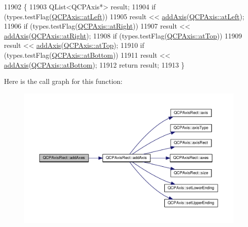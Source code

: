 \begin{DoxyCode}
11902 \{
11903   QList<QCPAxis*> result;
11904   \textcolor{keywordflow}{if} (types.testFlag(\hyperlink{class_q_c_p_axis_ae2bcc1728b382f10f064612b368bc18aaf84aa6cac6fb6099f54a2cbf7546b730}{QCPAxis::atLeft}))
11905     result << \hyperlink{class_q_c_p_axis_rect_a2dc336092ccc57d44a46194c8a23e4f4}{addAxis}(\hyperlink{class_q_c_p_axis_ae2bcc1728b382f10f064612b368bc18aaf84aa6cac6fb6099f54a2cbf7546b730}{QCPAxis::atLeft});
11906   \textcolor{keywordflow}{if} (types.testFlag(\hyperlink{class_q_c_p_axis_ae2bcc1728b382f10f064612b368bc18aadf5509f7d29199ef2f263b1dd224b345}{QCPAxis::atRight}))
11907     result << \hyperlink{class_q_c_p_axis_rect_a2dc336092ccc57d44a46194c8a23e4f4}{addAxis}(\hyperlink{class_q_c_p_axis_ae2bcc1728b382f10f064612b368bc18aadf5509f7d29199ef2f263b1dd224b345}{QCPAxis::atRight});
11908   \textcolor{keywordflow}{if} (types.testFlag(\hyperlink{class_q_c_p_axis_ae2bcc1728b382f10f064612b368bc18aac0ece2b680d3f545e701f75af1655977}{QCPAxis::atTop}))
11909     result << \hyperlink{class_q_c_p_axis_rect_a2dc336092ccc57d44a46194c8a23e4f4}{addAxis}(\hyperlink{class_q_c_p_axis_ae2bcc1728b382f10f064612b368bc18aac0ece2b680d3f545e701f75af1655977}{QCPAxis::atTop});
11910   \textcolor{keywordflow}{if} (types.testFlag(\hyperlink{class_q_c_p_axis_ae2bcc1728b382f10f064612b368bc18aa220d68888516b6c3b493d144f1ba438f}{QCPAxis::atBottom}))
11911     result << \hyperlink{class_q_c_p_axis_rect_a2dc336092ccc57d44a46194c8a23e4f4}{addAxis}(\hyperlink{class_q_c_p_axis_ae2bcc1728b382f10f064612b368bc18aa220d68888516b6c3b493d144f1ba438f}{QCPAxis::atBottom});
11912   \textcolor{keywordflow}{return} result;
11913 \}
\end{DoxyCode}


Here is the call graph for this function\+:\nopagebreak
\begin{figure}[H]
\begin{center}
\leavevmode
\includegraphics[width=350pt]{class_q_c_p_axis_rect_a792e1f3d9cb1591fca135bb0de9b81fc_cgraph}
\end{center}
\end{figure}


